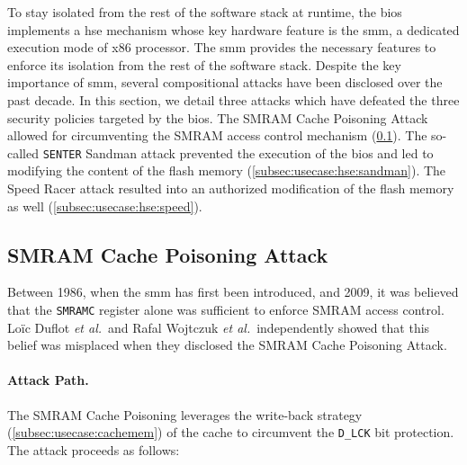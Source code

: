 To stay isolated from the rest of the software stack at runtime, the \ac{bios}
implements a \ac{hse} mechanism whose key hardware feature is the \ac{smm}, a
dedicated execution mode of x86 processor.
%
The \ac{smm} provides the necessary features to enforce its isolation from the
rest of the software stack.
%
Despite the key importance of \ac{smm}, several compositional attacks have been
disclosed over the past decade.
%
In this section, we detail three attacks which have defeated the three security
policies targeted by the \ac{bios}.
%
The SMRAM Cache Poisoning Attack allowed for circumventing the SMRAM access
control mechanism (\ref{subsec:usecase:hse:smram}).
%
The so-called \texttt{SENTER} Sandman attack prevented the execution of the
\ac{bios} and led to modifying the content of the flash memory
(\ref{subsec:usecase:hse:sandman}).
%
The Speed Racer attack resulted into an authorized modification of the flash
memory as well (\ref{subsec:usecase:hse:speed}).

\subsection{SMRAM Cache Poisoning Attack}
\label{subsec:usecase:hse:smram}

Between 1986, when the \ac{smm} has first been introduced, and 2009, it was
believed that the \texttt{SMRAMC} register alone was sufficient to enforce SMRAM
access control.
%
Loïc Duflot \emph{et al.}\,\cite{duflot2009smram} and Rafal Wojtczuk \emph{et
  al.}\,\cite{wojtczuk2009smram} independently showed that this belief was
misplaced when they disclosed the SMRAM Cache Poisoning Attack.

\paragraph{Attack Path.}
%
The SMRAM Cache Poisoning leverages the write-back strategy
(\ref{subsec:usecase:cachemem}) of the cache to circumvent the \texttt{D\_LCK}
bit protection.
%
The attack proceeds as follows:

